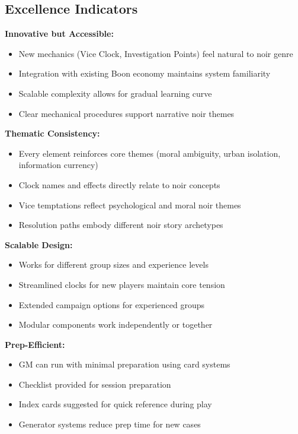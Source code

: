 \documentclass[11pt]{article}
\begin{document}
\subsection{Excellence Indicators}

\textbf{Innovative but Accessible:}
\begin{itemize}
\item New mechanics (Vice Clock, Investigation Points) feel natural to noir genre
\item Integration with existing Boon economy maintains system familiarity
\item Scalable complexity allows for gradual learning curve
\item Clear mechanical procedures support narrative noir themes
\end{itemize}

\textbf{Thematic Consistency:}
\begin{itemize}
\item Every element reinforces core themes (moral ambiguity, urban isolation, information currency)
\item Clock names and effects directly relate to noir concepts
\item Vice temptations reflect psychological and moral noir themes
\item Resolution paths embody different noir story archetypes
\end{itemize}

\textbf{Scalable Design:}
\begin{itemize}
\item Works for different group sizes and experience levels
\item Streamlined clocks for new players maintain core tension
\item Extended campaign options for experienced groups
\item Modular components work independently or together
\end{itemize}

\textbf{Prep-Efficient:}
\begin{itemize}
\item GM can run with minimal preparation using card systems
\item Checklist provided for session preparation
\item Index cards suggested for quick reference during play
\item Generator systems reduce prep time for new cases
\end{itemize}
\end{document}
